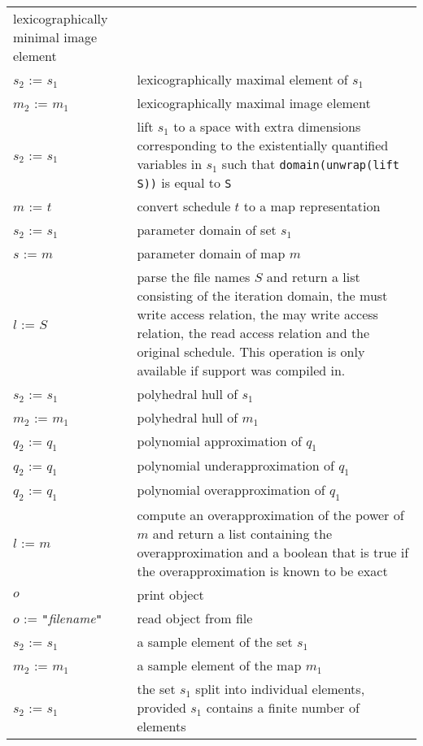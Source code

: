 \begin{supertabular}{p{0.35\textwidth}p{0.6\textwidth}}
lexicographically minimal image element
\\
$s_2$ :=  $s_1$ &
lexicographically maximal element of $s_1$
\\
$m_2$ :=  $m_1$ &
lexicographically maximal image element
\\
$s_2$ :=  $s_1$ &
lift $s_1$ to a space with extra dimensions corresponding
to the existentially quantified variables in $s_1$ such
that \lstinline!domain(unwrap(lift S))! is equal to \lstinline!S!
\\
$m$ :=  $t$ &
convert schedule $t$ to a map representation
\\
$s_2$ :=  $s_1$ &
parameter domain of set $s_1$
\\
$s$ :=  $m$ &
parameter domain of map $m$
\\
$l$ :=  $S$ &
parse the file names $S$ and return a list consisting of
the iteration domain, the must write access relation,
the may write access relation, the read access relation and
the original schedule.
This operation is only available if 
support was compiled in.
\\
$s_2$ :=  $s_1$ & polyhedral hull of $s_1$
\\
$m_2$ :=  $m_1$ & polyhedral hull of $m_1$
\\
$q_2$ :=  $q_1$ & polynomial approximation of $q_1$
\\
$q_2$ :=  $q_1$ & polynomial underapproximation of $q_1$
\\
$q_2$ :=  $q_1$ & polynomial overapproximation of $q_1$
\\
$l$ :=  $m$\ &
compute an overapproximation of the power
of $m$ and return a list containing the overapproximation
and a boolean that is true if the overapproximation
is known to be exact
\\
 $o$ &
print object
\\
$o$ :=  {\tt "}{\it filename}{\tt"} &
read object from file
\\
$s_2$ :=  $s_1$ &
a sample element of the set $s_1$
\\
$m_2$ :=  $m_1$ &
a sample element of the map $m_1$
\\
$s_2$ :=  $s_1$ &
the set $s_1$ split into individual elements,
provided $s_1$ contains a finite number of elements
\\

\end{supertabular}
